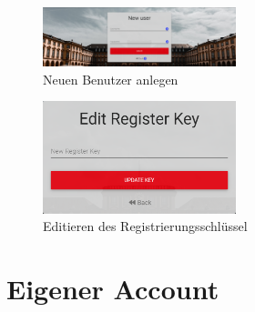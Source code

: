 \begin{figure}[H]
	\centering
	\includegraphics[width=0.5\textwidth, keepaspectratio]{img/guide/NewUser.png}
	\captionsetup{justification=centering, format=plain}
	\caption[Neuen Benutzer anlegen]{Neuen Benutzer anlegen \\\quelleScreenshot}
	\label{fig:NeuenBenutzerAnlegen}
\end{figure}


\begin{figure}[H]
	\centering
	\includegraphics[width=0.5\textwidth, keepaspectratio]{img/guide/EditRegisterKey.png}
	\captionsetup{justification=centering, format=plain}
	\caption[Editieren des Registrierungsschlüssel]{Editieren des Registrierungsschlüssel \\\quelleScreenshot}
	\label{fig:EditRegisterKey}
\end{figure}



\section{Eigener Account}
\label{ssec:EigenerAccount}

